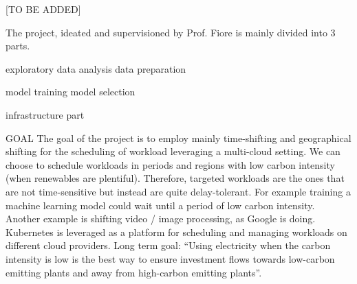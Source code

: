 [TO BE ADDED]

The project, ideated and supervisioned by Prof. Fiore is mainly divided into 3 parts.

exploratory data analysis
data preparation

model training
model selection

infrastructure part

GOAL
The goal of the project is to employ mainly time-shifting and geographical shifting for the scheduling of workload leveraging a multi-cloud setting.
We can choose to schedule workloads in periods and regions with low carbon intensity (when renewables are plentiful). 
Therefore, targeted workloads are the ones that are not time-sensitive but instead are quite delay-tolerant. For example training a machine learning model could wait until a period of low carbon intensity. Another example is shifting video / image processing, as Google is doing.
Kubernetes is leveraged as a platform for scheduling and managing workloads on different cloud providers.
Long term goal: “Using electricity when the carbon intensity is low is the best way to ensure investment flows towards low-carbon emitting plants and away from high-carbon emitting plants”.

\newpage
